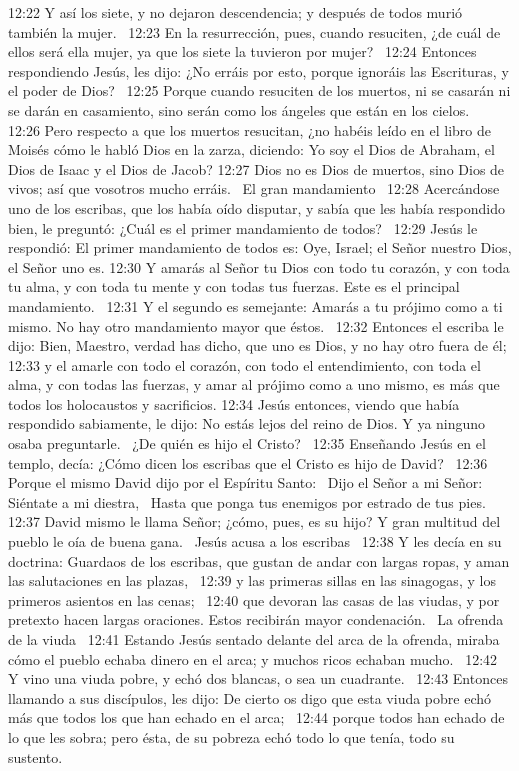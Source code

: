 12:22 Y así los siete, y no dejaron descendencia; y después de todos murió también la mujer.  
12:23 En la resurrección, pues, cuando resuciten, ¿de cuál de ellos será ella mujer, ya que los siete la tuvieron por mujer?  
12:24 Entonces respondiendo Jesús, les dijo: ¿No erráis por esto, porque ignoráis las Escrituras, y el poder de Dios?  
12:25 Porque cuando resuciten de los muertos, ni se casarán ni se darán en casamiento, sino serán como los ángeles que están en los cielos.  
12:26 Pero respecto a que los muertos resucitan, ¿no habéis leído en el libro de Moisés cómo le habló Dios en la zarza, diciendo: Yo soy el Dios de Abraham, el Dios de Isaac y el Dios de Jacob? 
12:27 Dios no es Dios de muertos, sino Dios de vivos; así que vosotros mucho erráis.  
El gran mandamiento   
12:28 Acercándose uno de los escribas, que los había oído disputar, y sabía que les había respondido bien, le preguntó: ¿Cuál es el primer mandamiento de todos?  
12:29 Jesús le respondió: El primer mandamiento de todos es: Oye, Israel; el Señor nuestro Dios, el Señor uno es. 
12:30 Y amarás al Señor tu Dios con todo tu corazón, y con toda tu alma, y con toda tu mente y con todas tus fuerzas. Este es el principal mandamiento.  
12:31 Y el segundo es semejante: Amarás a tu prójimo como a ti mismo. No hay otro mandamiento mayor que éstos.  
12:32 Entonces el escriba le dijo: Bien, Maestro, verdad has dicho, que uno es Dios, y no hay otro fuera de él; 
12:33 y el amarle con todo el corazón, con todo el entendimiento, con toda el alma, y con todas las fuerzas, y amar al prójimo como a uno mismo, es más que todos los holocaustos y sacrificios. 
12:34 Jesús entonces, viendo que había respondido sabiamente, le dijo: No estás lejos del reino de Dios. Y ya ninguno osaba preguntarle.  
¿De quién es hijo el Cristo?   
12:35 Enseñando Jesús en el templo, decía: ¿Cómo dicen los escribas que el Cristo es hijo de David?  
12:36 Porque el mismo David dijo por el Espíritu Santo:  
Dijo el Señor a mi Señor:  
Siéntate a mi diestra,  
Hasta que ponga tus enemigos por estrado de tus pies. 
12:37 David mismo le llama Señor; ¿cómo, pues, es su hijo? Y gran multitud del pueblo le oía de buena gana.  
Jesús acusa a los escribas   
12:38 Y les decía en su doctrina: Guardaos de los escribas, que gustan de andar con largas ropas, y aman las salutaciones en las plazas,  
12:39 y las primeras sillas en las sinagogas, y los primeros asientos en las cenas;  
12:40 que devoran las casas de las viudas, y por pretexto hacen largas oraciones. Estos recibirán mayor condenación.  
La ofrenda de la viuda   
12:41 Estando Jesús sentado delante del arca de la ofrenda, miraba cómo el pueblo echaba dinero en el arca; y muchos ricos echaban mucho.  
12:42 Y vino una viuda pobre, y echó dos blancas, o sea un cuadrante.  
12:43 Entonces llamando a sus discípulos, les dijo: De cierto os digo que esta viuda pobre echó más que todos los que han echado en el arca;  
12:44 porque todos han echado de lo que les sobra; pero ésta, de su pobreza echó todo lo que tenía, todo su sustento.  
